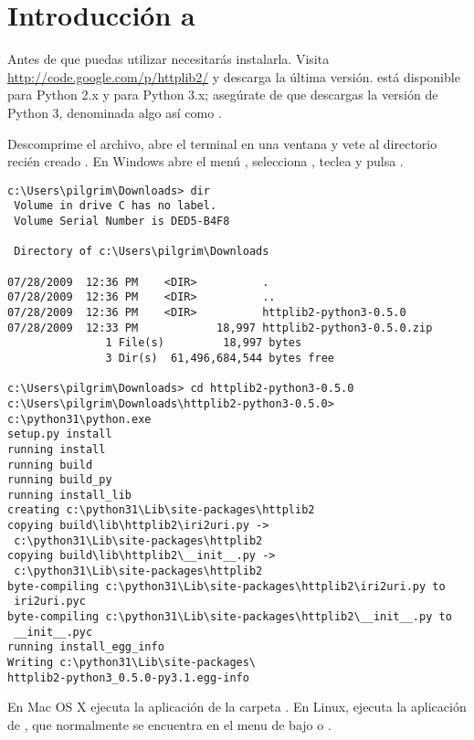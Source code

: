 \section{Introducción a }

Antes de que puedas utilizar  necesitarás instalarla. Visita \href{http://code.google.com/p/httplib2/}{http://code.google.com/p/httplib2/} y descarga la última versión.  está disponible para Python 2.x y para Python 3.x; asegúrate de que descargas la versión de Python 3, denominada algo así como .

Descomprime el archivo, abre el terminal en una ventana y vete al directorio recién creado . En Windows abre el menú , selecciona , teclea  y pulsa .

\noindent\begin{minipage}{\textwidth}
\begin{lstlisting}[mathescape=False]
c:\Users\pilgrim\Downloads> dir
 Volume in drive C has no label.
 Volume Serial Number is DED5-B4F8

 Directory of c:\Users\pilgrim\Downloads

07/28/2009  12:36 PM    <DIR>          .
07/28/2009  12:36 PM    <DIR>          ..
07/28/2009  12:36 PM    <DIR>          httplib2-python3-0.5.0
07/28/2009  12:33 PM            18,997 httplib2-python3-0.5.0.zip
               1 File(s)         18,997 bytes
               3 Dir(s)  61,496,684,544 bytes free

c:\Users\pilgrim\Downloads> cd httplib2-python3-0.5.0
c:\Users\pilgrim\Downloads\httplib2-python3-0.5.0> c:\python31\python.exe 
setup.py install
running install
running build
running build_py
running install_lib
creating c:\python31\Lib\site-packages\httplib2
copying build\lib\httplib2\iri2uri.py -> 
 c:\python31\Lib\site-packages\httplib2
copying build\lib\httplib2\__init__.py -> 
 c:\python31\Lib\site-packages\httplib2
byte-compiling c:\python31\Lib\site-packages\httplib2\iri2uri.py to
 iri2uri.pyc
byte-compiling c:\python31\Lib\site-packages\httplib2\__init__.py to
 __init__.pyc
running install_egg_info
Writing c:\python31\Lib\site-packages\
httplib2-python3_0.5.0-py3.1.egg-info
\end{lstlisting}
\end{minipage}

En Mac OS X ejecuta la aplicación  de la carpeta . En Linux, ejecuta la aplicación de , que normalmente se encuentra en el menu de  bajo  o .

